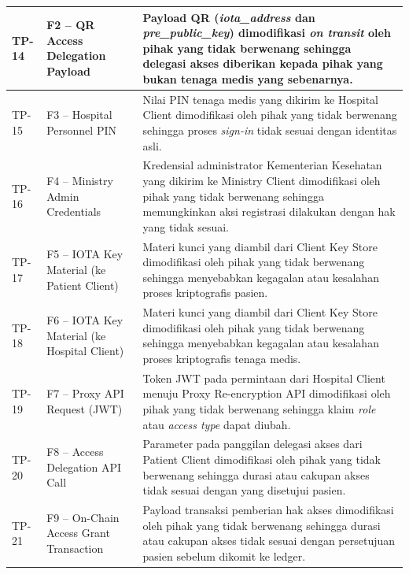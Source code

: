\begin{xltabular}{\textwidth}{|>{\centering\arraybackslash}p{1.8cm}|>{\raggedright\arraybackslash}p{3.2cm}|X|}
    TP-14 &
    F2 -- QR Access Delegation Payload &
    Payload QR (\textit{iota\_address} dan \textit{pre\_public\_key}) dimodifikasi \textit{on transit} oleh pihak yang tidak berwenang sehingga delegasi akses diberikan kepada pihak yang bukan tenaga medis yang sebenarnya. \\
    \hline

    TP-15 &
    F3 -- Hospital Personnel PIN &
    Nilai PIN tenaga medis yang dikirim ke Hospital Client dimodifikasi oleh pihak yang tidak berwenang sehingga proses \textit{sign-in} tidak sesuai dengan identitas asli. \\
    \hline

    TP-16 &
    F4 -- Ministry Admin Credentials &
    Kredensial administrator Kementerian Kesehatan yang dikirim ke Ministry Client dimodifikasi oleh pihak yang tidak berwenang sehingga memungkinkan aksi registrasi dilakukan dengan hak yang tidak sesuai. \\
    \hline

    TP-17 &
    F5 -- IOTA Key Material (ke Patient Client) &
    Materi kunci yang diambil dari Client Key Store dimodifikasi oleh pihak yang tidak berwenang sehingga menyebabkan kegagalan atau kesalahan proses kriptografis pasien. \\
    \hline

    TP-18 &
    F6 -- IOTA Key Material (ke Hospital Client) &
    Materi kunci yang diambil dari Client Key Store dimodifikasi oleh pihak yang tidak berwenang sehingga menyebabkan kegagalan atau kesalahan proses kriptografis tenaga medis. \\
    \hline

    TP-19 &
    F7 -- Proxy API Request (JWT) &
    Token JWT pada permintaan dari Hospital Client menuju Proxy Re-encryption API dimodifikasi oleh pihak yang tidak berwenang sehingga klaim \textit{role} atau \textit{access type} dapat diubah. \\
    \hline

    TP-20 &
    F8 -- Access Delegation API Call &
    Parameter pada panggilan delegasi akses dari Patient Client dimodifikasi oleh pihak yang tidak berwenang sehingga durasi atau cakupan akses tidak sesuai dengan yang disetujui pasien. \\
    \hline

    TP-21 &
    F9 -- On-Chain Access Grant Transaction &
    Payload transaksi pemberian hak akses dimodifikasi oleh pihak yang tidak berwenang sehingga durasi atau cakupan akses tidak sesuai dengan persetujuan pasien sebelum dikomit ke ledger. \\
    \hline


\end{xltabular}

